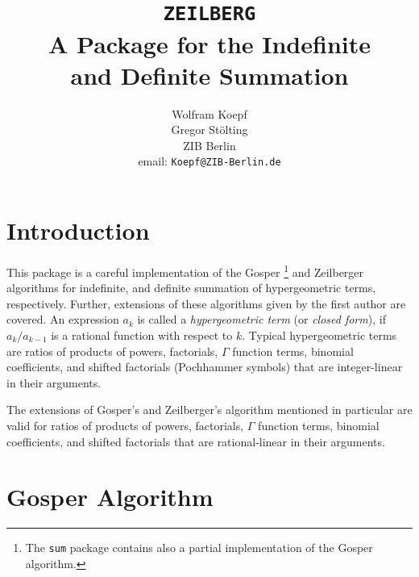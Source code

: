\title{{\tt ZEILBERG}\\
A Package for the Indefinite\\
and Definite Summation}
\date{}
\author{Wolfram Koepf\\
        Gregor St\"olting \\
        ZIB Berlin \\
        email: {\tt  Koepf@ZIB-Berlin.de}
}

\maketitle
\newcommand{\N} {{\rm {\mbox{\protect\makebox[.15em][l]{I}N}}}}
\newcommand{\funkdef}[3]{\left\{\!\!\!\begin{array}{cc}
                                #1 & \!\!\!\mbox{\rm{if} $#2$ } \\
                                #3 & \!\!\!\mbox{\rm{otherwise}}
                                \end{array}
                         \right.}

\section{Introduction}

This package is a careful implementation of the Gosper%
\footnote{The {\tt sum} package contains also a partial implementation
of the Gosper algorithm.}
and Zeilberger algorithms for indefinite, and definite summation of
hypergeometric terms, respectively. Further, extensions of these algorithms
given by the first author are covered. An expression $a_k$ is called a
{\sl hypergeometric term} (or {\sl closed form}),
if $a_{k}/a_{k-1}$ is a rational function with respect to $k$.
Typical hypergeometric terms are ratios of products of powers, factorials,
$\Gamma$ function terms, binomial coefficients, and shifted factorials
(Pochhammer symbols) that are integer-linear in their arguments.

The extensions of Gosper's and Zeilberger's algorithm mentioned
in particular are valid for ratios of products of powers, factorials,
$\Gamma$ function terms, binomial coefficients, and shifted factorials
that are rational-linear in their arguments.

\section{Gosper Algorithm}

